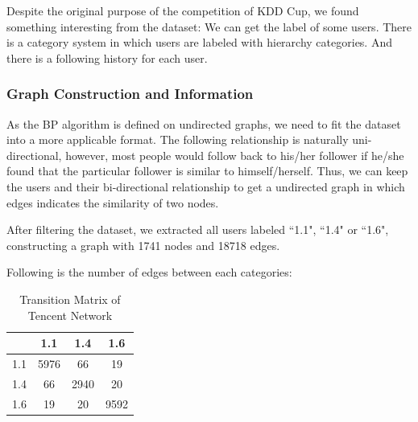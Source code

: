 Despite the original purpose of the competition of KDD Cup, we found something interesting from the dataset:
We can get the label of some users. There is a category system in which users are labeled with hierarchy categories. And there is a following history for each user.

\subsubsection*{Graph Construction and Information}
As the BP algorithm is defined on undirected graphs, we need to fit the dataset into a more applicable format.
The following relationship is naturally uni-directional, however, most people would follow back to his/her follower if he/she found that the particular follower is similar to himself/herself.
Thus, we can keep the users and their bi-directional relationship to get a undirected graph in which edges indicates the similarity of two nodes.

After filtering the dataset, we extracted all users labeled ``1.1", ``1.4" or ``1.6", constructing a graph with 1741 nodes and 18718 edges.

\begin{table}[!ht]
\centering
{}
\end{table}

Following is the number of edges between each categories:

\begin{table}[!ht]
\centering
\begin{tabular}{c|c|c|c}
\toprule
& 1.1 & 1.4 & 1.6\\
\midrule
1.1 & 5976 & 66 & 19\\
1.4 & 66 & 2940 & 20\\
1.6 & 19 & 20 & 9592\\
\bottomrule
\end{tabular}
\caption{Transition Matrix of Tencent Network}
\end{table}


